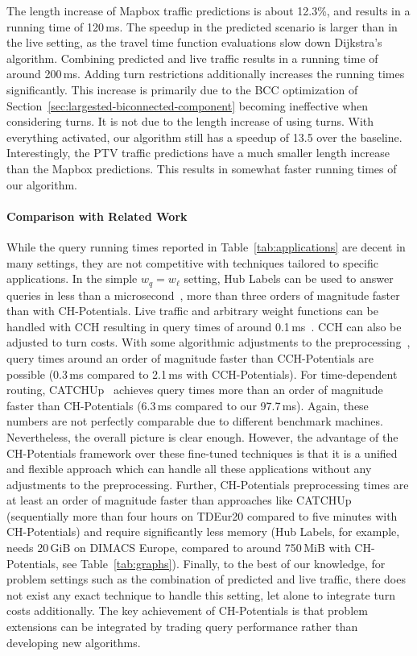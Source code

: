 \documentclass[manuscript,review]{acmart}
\begin{document}
The length increase of Mapbox traffic predictions is about 12.3\%, and results in a running time of 120\,ms.
The speedup in the predicted scenario is larger than in the live setting, as the travel time function evaluations slow down Dijkstra's algorithm.
Combining predicted and live traffic results in a running time of around 200\,ms.
Adding turn restrictions additionally increases the running times significantly.
This increase is primarily due to the BCC optimization of Section~\ref{sec:largested-biconnected-component} becoming ineffective when considering turns.
It is not due to the length increase of using turns.
With everything activated, our algorithm still has a speedup of 13.5 over the baseline.
Interestingly, the PTV traffic predictions have a much smaller length increase than the Mapbox predictions.
This results in somewhat faster running times of our algorithm.

\paragraph{Comparison with Related Work}

While the query running times reported in Table~\ref{tab:applications} are decent in many settings, they are not competitive with techniques tailored to specific applications.
In the simple $w_q = w_{\ell}$ setting, Hub Labels can be used to answer queries in less than a microsecond~\cite{DBLP:conf/wea/DellingGW13}, more than three orders of magnitude faster than with CH-Potentials.
Live traffic and arbitrary weight functions can be handled with CCH resulting in query times of around 0.1\,ms~\cite{DBLP:journals/jea/Buchhold0W19}.
CCH can also be adjusted to turn costs.
With some algorithmic adjustments to the preprocessing~\cite{bwzz-cchtc-20}, query times around an order of magnitude faster than CCH-Potentials are possible (0.3\,ms compared to 2.1\,ms with CCH-Potentials).
For time-dependent routing, CATCHUp~\cite{swz-sfert-21} achieves query times more than an order of magnitude faster than CH-Potentials (6.3\,ms compared to our 97.7\,ms).
Again, these numbers are not perfectly comparable due to different benchmark machines.
Nevertheless, the overall picture is clear enough.
However, the advantage of the CH-Potentials framework over these fine-tuned techniques is that it is a unified and flexible approach which can handle all these applications without any adjustments to the preprocessing.
Further, CH-Potentials preprocessing times are at least an order of magnitude faster than approaches like CATCHUp (sequentially more than four hours on TDEur20 compared to five minutes with CH-Potentials) and require significantly less memory (Hub Labels, for example, needs 20\,GiB on DIMACS Europe, compared to around 750\,MiB with CH-Potentials, see Table~\ref{tab:graphs}).
Finally, to the best of our knowledge, for problem settings such as the combination of predicted and live traffic, there does not exist any exact technique to handle this setting, let alone to integrate turn costs additionally.
The key achievement of CH-Potentials is that problem extensions can be integrated by trading query performance rather than developing new algorithms.
\end{document}
